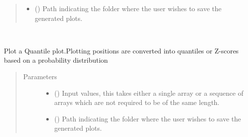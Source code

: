 \documentclass[letterpaper,10pt,english,openany, oneside]{sphinxmanual}
\begin{document}
\begin{fulllineitems}
\begin{fulllineitems}
\begin{quote}
\begin{description}
\begin{itemize}
\item {} 
 (\sphinxstyleliteralemphasis{\sphinxupquote{, }}) \textendash{} Path indicating the folder where the user wishes to save the generated plots.

\end{itemize}

\end{description}\end{quote}

\end{fulllineitems}


\begin{fulllineitems}
\label{\detokenize{index:fompy.plots.plotter.qq}}~

\begin{fulllineitems}
Plot a Quantile plot.Plotting positions are converted into quantiles
or Z-scores based on a probability distribution

\end{fulllineitems}

\begin{quote}\begin{description}
\item[{Parameters}] \leavevmode\begin{itemize}
\item {} 
 (\sphinxstyleliteralemphasis{\sphinxupquote{, }}\sphinxstyleliteralemphasis{\sphinxupquote{ (}}\sphinxstyleliteralemphasis{\sphinxupquote{,}}\sphinxstyleliteralemphasis{\sphinxupquote{)}}) \textendash{} Input values, this takes either a single array or a sequence of arrays
which are not required to be of the same length.

\item {} 
 (\sphinxstyleliteralemphasis{\sphinxupquote{, }}) \textendash{} Path indicating the folder where the user wishes to save the generated plots.


\end{itemize}
\end{description}
\end{quote}
\end{fulllineitems}
\end{fulllineitems}
\end{document}
